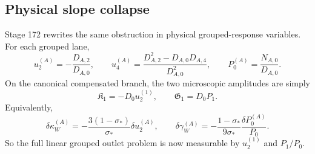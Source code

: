 \subsection{Physical slope collapse}
Stage 172 rewrites the same obstruction in physical grouped-response variables.  For each grouped lane,
\begin{equation}
\label{eq:part05-u2-u4-P0-defs}
u_2^{(A)}=-\frac{D_{A,2}}{D_{A,0}},
\qquad
u_4^{(A)}=\frac{D_{A,2}^2-D_{A,0}D_{A,4}}{D_{A,0}^2},
\qquad
P_0^{(A)}=\frac{N_{A,0}}{D_{A,0}}.
\end{equation}
On the canonical compensated branch, the two microscopic amplitudes are simply
\begin{equation}
\label{eq:part05-KG-physical}
\mathfrak K_1=-D_0u_2^{(1)},
\qquad
\mathfrak G_1=D_0P_1.
\end{equation}
Equivalently,
\begin{equation}
\label{eq:part05-dk-dg-physical}
\delta\kappa_W^{(A)}
=-\frac{3(1-\sigma_*)}{\sigma_*}\delta u_2^{(A)},
\qquad
\delta\gamma_W^{(A)}
=-\frac{1-\sigma_*}{9\sigma_*}\frac{\delta P_0^{(A)}}{P_0}.
\end{equation}
So the full linear grouped outlet problem is now measurable by \(u_2^{(1)}\) and \(P_1/P_0\).

